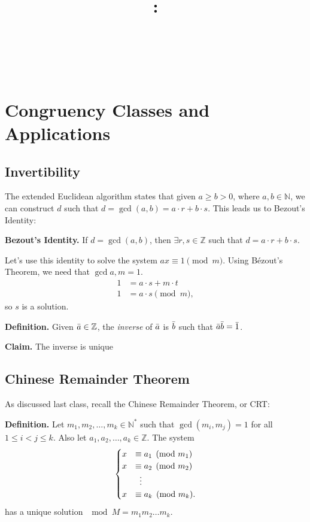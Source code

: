 \documentclass{article}
\title{
    \vspace{2in}
    \textbf{\lectClass:\\ \lectTitle}\\
    \vspace{0.1in}\large{\textit{\lectClassInstructor\ \lectSection}}
    \vspace{3in}
    \author{\textbf{\lectAuthorName}}
    \date{}
}
\begin{document}
\maketitle
\pagebreak

\section*{Congruency Classes and Applications}

\subsection*{Invertibility}
    The extended Euclidean algorithm states that given $a \ge b > 0$, where $a, b \in \mathbb{N}$, we can construct $d$ such that $d = \gcd(a, b) = a \cdot r + b \cdot s$. This leads us to Bezout's Identity:
    
    \vspace{1.5mm}
    \textbf{Bezout's Identity.} If $d = \gcd(a, b)$, then $\exists r, s \in \mathbb{Z}$ such that $d = a \cdot r + b \cdot s$.
    
    \vspace{1.5mm}
    Let's use this identity to solve the system $ax \equiv 1 \pmod{m}$. Using B\'ezout's Theorem, we need that $\gcd{a, m} = 1$.
    \begin{align*}
        1 &= a \cdot s + m \cdot t \\
        1 &= a \cdot s \pmod{m},
    \end{align*}
    so $s$ is a solution.
    
    \vspace{1.5mm}
    \textbf{Definition.} Given $\Bar{a} \in \mathbb{Z}$, the \textit{inverse} of $\Bar{a}$ is $\Bar{b}$ such that $\Bar{a}\Bar{b} = \Bar{1}$.
    
    \textbf{Claim.} The inverse is unique
    

\subsection*{Chinese Remainder Theorem}
    As discussed last class, recall the Chinese Remainder Theorem, or CRT: 
    
    \vspace{1.5mm}
    \textbf{Definition.} Let $m_{1}, m_{2}, \dots, m_{k} \in \mathbb{N}^{*}$ such that $\gcd(m_{i}, m_{j}) = 1$ for all $1 \le i < j \le k$. Also let $a_{1}, a_{2}, \dots, a_{k} \in \mathbb{Z}$. The system
    $$\begin{cases}
        x &\equiv a_{1} \pmod{m_{1}} \\
        x &\equiv a_{2} \pmod{m_{2}} \\
        &\vdotswithin{ = } \\
        x &\equiv a_{k} \pmod{m_{k}}.
    \end{cases}$$
    has a unique solution $\mod M = m_{1}m_{2}\dots m_{k}$.
    
\end{document}
